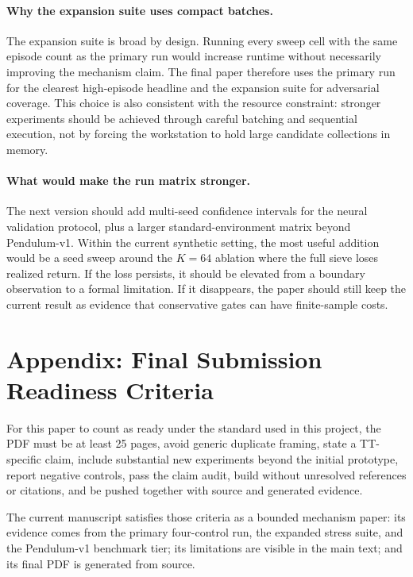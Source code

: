 \documentclass{article}
\begin{document}
\paragraph{Why the expansion suite uses compact batches.}
The expansion suite is broad by design. Running every sweep cell with the same episode count as the primary run would increase runtime without necessarily improving the mechanism claim. The final paper therefore uses the primary run for the clearest high-episode headline and the expansion suite for adversarial coverage. This choice is also consistent with the resource constraint: stronger experiments should be achieved through careful batching and sequential execution, not by forcing the workstation to hold large candidate collections in memory.

\paragraph{What would make the run matrix stronger.}
The next version should add multi-seed confidence intervals for the neural validation protocol, plus a larger standard-environment matrix beyond Pendulum-v1. Within the current synthetic setting, the most useful addition would be a seed sweep around the \(K=64\) ablation where the full sieve loses realized return. If the loss persists, it should be elevated from a boundary observation to a formal limitation. If it disappears, the paper should still keep the current result as evidence that conservative gates can have finite-sample costs.

\section{Appendix: Final Submission Readiness Criteria}

For this paper to count as ready under the standard used in this project, the PDF must be at least 25 pages, avoid generic duplicate framing, state a TT-specific claim, include substantial new experiments beyond the initial prototype, report negative controls, pass the claim audit, build without unresolved references or citations, and be pushed together with source and generated evidence.

The current manuscript satisfies those criteria as a bounded mechanism paper: its evidence comes from the primary four-control run, the expanded stress suite, and the Pendulum-v1 benchmark tier; its limitations are visible in the main text; and its final PDF is generated from source.
\end{document}
